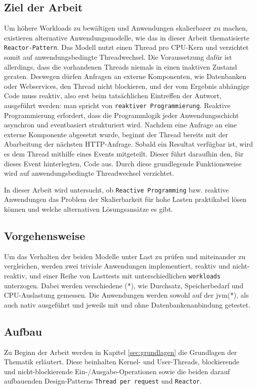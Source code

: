 \subsection{Ziel der Arbeit}
\label{subsec:ziel}
Um höhere Workloads zu bewältigen und Anwendungen skalierbarer zu machen, existieren alternative
Anwendungsmodelle, wie das in dieser Arbeit thematisierte \verb|Reactor-Pattern|.
Das Modell nutzt einen Thread pro CPU-Kern und verzichtet somit auf anwendungsbedingte Threadwechsel.
Die Voraussetzung dafür ist allerdings, dass die vorhandenen Threads niemals in einen inaktiven Zustand geraten.
Deswegen dürfen Anfragen an externe Komponenten, wie Datenbanken oder Webservices, den Thread nicht blockieren,
und der vom Ergebnis abhängige Code muss reaktiv, also erst beim tatsächlichen Eintreffen der Antwort,
ausgeführt werden: man spricht von \verb|reaktiver Programmierung|.
Reaktive Programmierung erfordert, dass die Programmlogik jeder
Anwendungsschicht asynchron und eventbasiert strukturiert wird.
Nachdem eine Anfrage an eine externe Komponente abgesetzt wurde, beginnt der Thread bereits mit der Abarbeitung der nächsten
HTTP-Anfrage. Sobald ein Resultat verfügbar ist, wird es dem Thread mithilfe eines Events mitgeteilt.
Dieser führt daraufhin den, für dieses Event hinterlegten, Code aus. Durch diese grundlegende Funktionsweise wird auf anwendungsbedingte
Threadwechsel verzichtet.

In dieser Arbeit wird untersucht, ob \verb|Reactive Programming| bzw. reaktive Anwendungen das Problem der Skalierbarkeit
für hohe Lasten praktikabel lösen können und welche alternativen Lösungsansätze es gibt.

\subsection{Vorgehensweise}
\label{subsec:vorgehensweise}
Um das Verhalten der beiden Modelle unter Last zu prüfen und miteinander zu vergleichen, werden zwei triviale Anwendungen implementiert,
reaktiv und nicht-reaktiv, und einer Reihe von Lasttests mit unterschiedlichen \verb|workloads| unterzogen.
Dabei werden verschiedene (*), wie Durchsatz, Speicherbedarf und CPU-Auslastung gemessen.
Die Anwendungen werden sowohl auf der \acrshort{jvm}(*), als auch nativ ausgeführt und jeweils mit und ohne Datenbankenanbindung getestet.

\subsection{Aufbau}
\label{subsec:aufbau}
Zu Beginn der Arbeit werden in Kapitel \ref{sec:grundlagen} die Grundlagen der Thematik erläutert. Diese beinhalten
Kernel- und User-Threads, blockierende und nicht-blockierende Ein-/Ausgabe-Operationen sowie die beiden darauf aufbauenden Design-Patterns
\verb|Thread per request| und \verb|Reactor|.

